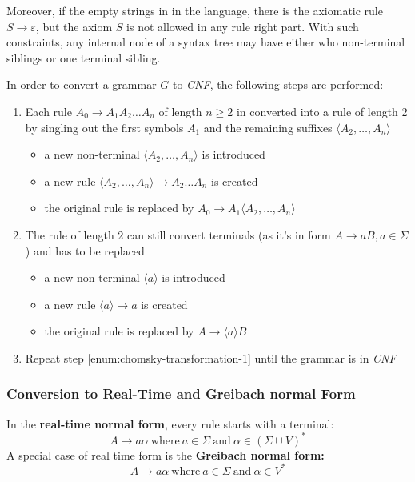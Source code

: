 \documentclass[english]{article}
\begin{document}
Moreover, if the empty strings in in the language, there is the axiomatic rule \(S \rightarrow \varepsilon\), but the axiom \(S\) is not allowed in any rule right part.
With such constraints, any internal node of a syntax tree may have either who non-terminal siblings or one terminal sibling.

In order to convert a grammar \(G\) to \textit{CNF}, the following steps are performed:

\begin{enumerate}[label=\arabic*., ref=(\arabic*)]
  \item\label{enum:chomsky-transformation-1} Each rule \(A_0 \rightarrow A_1 A_2 \ldots A_n\) of length \(n \geq 2\) in converted into a rule of length \(2\) by singling out the first symbols \(A_1\) and the remaining suffixes \(\langle A_2, \ldots, A_n \rangle\)
  \begin{itemize}
    \item a new non-terminal \(\langle A_2, \ldots, A_n \rangle\) is introduced
    \item a new rule \(\langle A_2, \ldots, A_n \rangle \rightarrow A_2 \ldots A_n\) is created
    \item the original rule is replaced by \(A_0 \rightarrow A_1 \langle A_2, \ldots, A_n \rangle\)
  \end{itemize}
  \item The rule of length \(2\) can still convert terminals (as it's in form \(A \rightarrow aB, a \in \Sigma\)) and has to be replaced
        \begin{itemize}
          \item a new non-terminal \(\langle a \rangle\) is introduced
          \item a new rule \(\langle a \rangle \rightarrow a\) is created
          \item the original rule is replaced by \(A \rightarrow \langle a \rangle B\)
        \end{itemize}
  \item Repeat step \ref{enum:chomsky-transformation-1} until the grammar is in \textit{CNF}
\end{enumerate}

\subsubsection{Conversion to Real-Time and Greibach normal Form}
\label{sec:conversion-to-greibach-and-real-time-normal-form}

In the \textbf{real-time normal form}, every rule starts with a terminal:
\[A \rightarrow a \alpha \ \text{where} \ a \in \Sigma \ \text{and} \ \alpha \in \left( \Sigma \cup V \right)^\ast \]
A special case of real time form is the \textbf{Greibach normal form:}
\[ A \rightarrow a \alpha \ \text{where} \ a \in \Sigma \ \text{and} \ \alpha \in V^\ast \]
\end{document}
